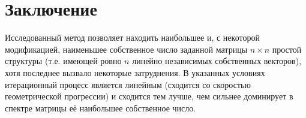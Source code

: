 



\setcounter{page}{2}
\tableofcontents









\section{Заключение}
Исследованный метод позволяет находить наибольшее и, с некоторой модификацией, наименьшее собственное число заданной матрицы $n\times n$ простой структуры (т.е. имеющей ровно $n$ линейно независимых собственных векторов), хотя последнее вызвало некоторые затруднения. В указанных условиях итерационный процесс является линейным (сходится со скоростью геометрической прогрессии) и сходится тем лучше, чем сильнее доминирует в спектре матрицы её наибольшее собственное число.


